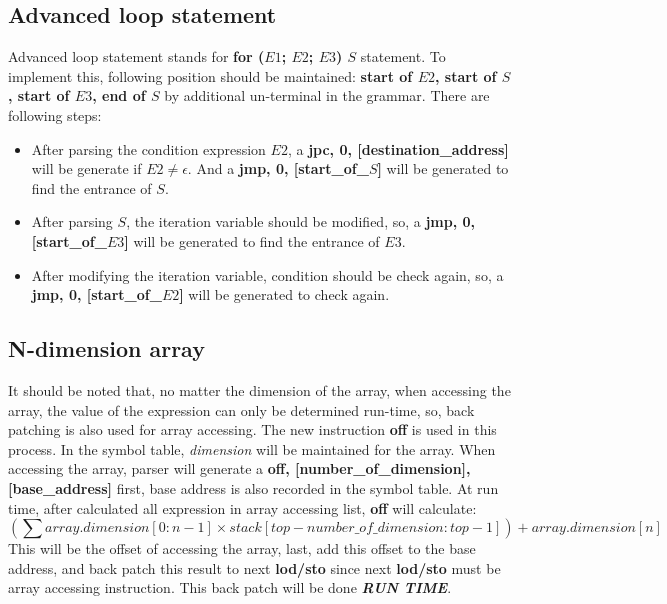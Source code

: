 \documentclass{article}
\begin{document}
		\subsection{Advanced loop statement}
		Advanced loop statement stands for \textbf{for ($ E1 $; $ E2 $; $ E3 $) $ S $} statement. To implement this, following position should be maintained: \textbf{start of $ E2 $, start of $ S $, start of $ E3 $, end of $ S $} by additional un-terminal in the grammar. There are following steps:\\
		\begin{itemize}
		\item After parsing the condition expression $ E2 $, a \textbf{jpc, 0, [destination\_address]} will be generate if \textbf{\emph{$ E2 \neq \epsilon $}}. And a \textbf{jmp, 0, [start\_of\_$ S $]} will be generated to find the entrance of $ S $.
		\item After parsing $ S $, the iteration variable should be modified, so, a \textbf{jmp, 0, [start\_of\_$ E3 $]} will be generated to find the entrance of $ E3 $.
		\item After modifying the iteration variable, condition should be check again, so, a \textbf{jmp, 0, [start\_of\_$ E2 $]} will be generated to check again.
		\end{itemize}
		\subsection{N-dimension array}
		It should be noted that, no matter the dimension of the array, when accessing the array, the value of the expression can only be determined run-time, so, back patching is also used for array accessing. The new instruction \textbf{off} is used in this process. In the symbol table, \emph{dimension} will be maintained for the array. When accessing the array, parser will generate a \textbf{off, [number\_of\_dimension], [base\_address]} first, base address is also recorded in the symbol table. At run time, after calculated all expression in array accessing list, \textbf{off} will calculate:
		\begin{equation}
		(\sum array.dimension[0:n-1] \times stack[top-number\_of\_dimension:top-1]) + array.dimension[n]
		\end{equation}
		This will be the offset of accessing the array, last, add this offset to the base address, and back patch this result to next \textbf{lod/sto} since next \textbf{lod/sto} must be array accessing instruction. This back patch will be done \textbf{\emph{RUN TIME}}.
\end{document}
